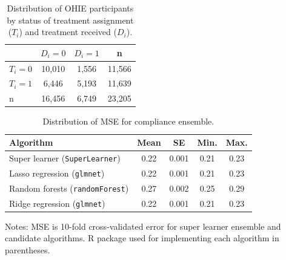 \documentclass[hidelinks,12pt]{article}
\begin{document}
\begin{appendices}
\begin{table}[h]
	\begin{center}
	\caption{Distribution of OHIE participants by status of treatment assignment ($T_i$) and treatment received ($D_i$).\label{ohie-status}} 
	\begin{tabular}{@{}lccc@{}}
		\toprule
		& $D_i = 0$ & $D_i = 1$ & n      \\ \midrule
		$T_i = 0$ & 10,010    & 1,556     & 11,566 \\
		$T_i = 1$ & 6,446     & 5,193     & 11,639 \\
		n         & 16,456    & 6,749     & 23,205 \\ \bottomrule
	\end{tabular}
	\end{center}
\end{table}

\begin{table}[h]
\begin{center}
\caption{Distribution of MSE for compliance ensemble.\label{compliance-ensemble}} 
\begin{tabular}{lcccc}
  \hline
 Algorithm & Mean & SE & Min. & Max. \\ 
  \hline
        \rowcolor{Gray}
Super learner (\texttt{SuperLearner}) & 0.22  & 0.001 & 0.21 & 0.23 \\
Lasso regression (\texttt{glmnet})  & 0.22  & 0.001 & 0.21 & 0.23 \\
Random forests (\texttt{randomForest}) & 0.27  & 0.002 & 0.25 & 0.29 \\
Ridge regression (\texttt{glmnet}) & 0.22  & 0.001 & 0.21 & 0.23 \\
   \hline
\end{tabular} 
\end{center}
\footnotesize{{\color{red}Notes: MSE is 10-fold cross-validated error for super learner ensemble and candidate algorithms. \textsf{R} package used for implementing each algorithm in parentheses.}}
\end{table}

\pagebreak


\end{appendices}
\end{document}
